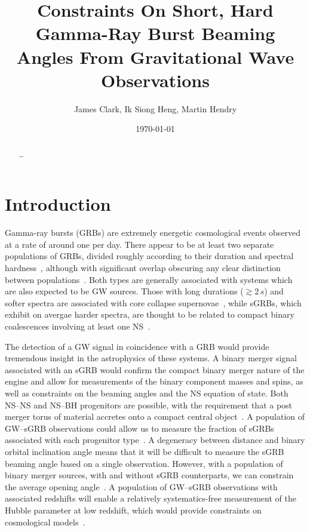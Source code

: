 \documentclass[twocolumn,nofootinbib]{revtex4-1}
\newcommand{\BNS}{\ac{NS}--\ac{NS}\xspace}
\newcommand{\NSBH}{\ac{NS}--\ac{BH}\xspace}
\newcommand{\JOINT}{\ac{GW}--\ac{sGRB}\xspace}
\begin{document}
\title{Constraints On Short, Hard Gamma-Ray Burst Beaming Angles From
Gravitational Wave Observations}
\author{James Clark, Ik Siong Heng, Martin Hendry}
\date{\today}

\begin{abstract}
\dots
\end{abstract}

\maketitle

\section{Introduction}
Gamma-ray bursts (GRBs) are extremely energetic cosmological events observed at a rate of around one per day.
There appear to be at least two separate populations of \acp{GRB}, divided roughly according to their duration and spectral hardness~\cite{Kouveliotou:1993yx}, although with significant overlap obscuring any clear distinction between populations~\cite{Zhang:2009uf,Bromberg:2012gp}.
Both types are generally associated with systems which are also expected to be \ac{GW} sources.
Those with long durations ($\gtrsim 2\,s$) and softer spectra are associated with core collapse supernovae~\cite{Galama:1998ea,MacFadyen:1998vz,Woosley:2006fn}, while \acp{sGRB}, which exhibit on avergae harder spectra, are thought to be related to compact binary coalescences involving at least one \ac{NS}~\cite{Eichler:1989ve,Paczynski:1991aq,Narayan:1992iy,Lee:2007js}.

The detection of a \ac{GW} signal in coincidence with a \ac{GRB} would provide tremendous insight in the  astrophysics of these systems.
A binary merger signal associated with an \ac{sGRB} would confirm the compact binary merger nature of the engine and allow for measurements of the binary component masses and spins, as well as constraints on the beaming angles and the \ac{NS} equation of state.
Both \BNS and \NSBH progenitors are possible, with the requirement that a post merger torus of material accretes onto a compact central object~\cite{Blandford:1977ds,Rosswog:2002rt,Giacomazzo:2012zt}.
A population of \JOINT observations could allow us to measure the fraction of \acp{sGRB} associated with each progenitor type~\cite{Kreidberg:2012ud}.
A degeneracy between distance and binary orbital inclination angle means that it will be difficult to measure the \ac{sGRB} beaming angle based on a single observation.
However, with a population of binary merger sources, with and without \ac{sGRB} counterparts, we can constrain the average opening angle~\cite{Clark:2014jpa}.
A population of \JOINT observations with associated redshifts will enable a relatively systematics-free measurement of the Hubble parameter at low redshift, which would provide constraints on cosmological models~\cite{Schutz:1986gp,Chen:2012qh}.
\end{document}
